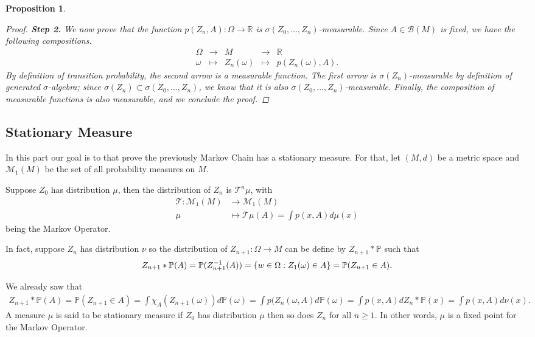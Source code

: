 \documentclass[a4paper]{article}
\theoremstyle{plain}
\newtheorem{prop} [theorem]{Proposition}
\theoremstyle{definition}
\newcommand{\R}{\mathbb{R}}
\begin{document}
\begin{prop}
\begin{proof}
			\noindent\textbf{Step 2.} We now prove that the function $p(Z_{n},A): \Omega \to \R$ is $\sigma(Z_{0},\dots,Z_{n})$-measurable. Since $A \in \mathcal{B}(M)$ is fixed, we have the following compositions.
			\begin{equation*}
				\begin{array}{ccccc}
					\Omega &\longrightarrow& M & \longrightarrow& \R \\
					\omega &\longmapsto &Z_{n}(\omega)& \longmapsto &p(Z_{n}(\omega),A).
				\end{array}
			\end{equation*}
			By definition of transition probability, the second arrow is a measurable function. The first arrow is $\sigma(Z_{n})$-measurable by definition of generated $\sigma$-algebra; since $\sigma(Z_{n}) \subset \sigma(Z_{0},\dots,Z_{n})$, we know that it is also $\sigma(Z_{0},\dots,Z_{n})$-measurable. Finally, the composition of measurable functions is also measurable, and we conclude the proof.
		\end{proof}
            \end{prop}


\subsection{Stationary Measure}

In this part our goal is to that prove the previously Markov Chain has a stationary measure. 
For that, let $(M,d)$ be a metric space and $\mathcal{M}_1(M)$ be the set of all probability measures on $M$. 

Suppose $Z_0$ has distribution $\mu$, then the distribution of $Z_n$ is $\mathcal{T}^n  \mu$, with 
\begin{align*}
    \mathcal{T}:\mathcal{M}_1(M) &\to \mathcal{M}_1(M)\\
    \mu &\mapsto \mathcal{T}\mu (A) = \int p(x,A) d\mu(x)
\end{align*}
being the Markov Operator.

In fact, suppose $Z_n$ has distribution $\nu$ so the distribution of $Z_{n+1}:\Omega\to M$ can be define by $Z_{n+1}*\mathbb{P}$ such that 
$$Z_{n+1}*\mathbb{P}(A) = \mathbb{P}(Z_{n+1}^{-1}(A)) = \mathbb\{w \in \Omega: Z_1(\omega) \in A\} = \mathbb{P}(Z_{n+1} \in A).$$

We already saw that 
\begin{align*}
    Z_{n+1}*\mathbb{P}(A) = \mathbb{P}(Z_{n+1} \in A) 
    = \int \chi_A(Z_{n+1}(\omega))d\mathbb{P}(\omega)
    = \int p(Z_n(\omega,A) d\mathbb{P}(\omega)
    = \int p(x,A) dZ_n*\mathbb{P}(x)
    = \int p(x,A) d\nu(x).
\end{align*}
A measure $\mu$ is said to be stationary measure if $Z_0$ has distribution $\mu$ then so does $Z_n$ for all $n \geq 1$. In other words, $\mu$ is a fixed point for the Markov Operator.
\end{document}
